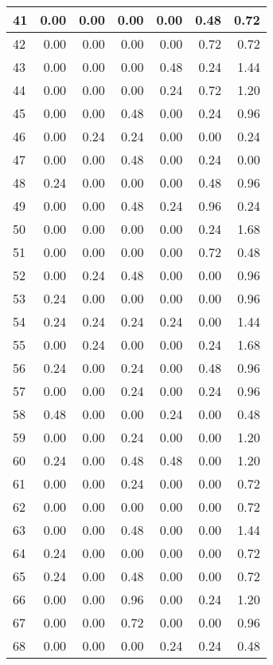 \begin{table}
{\begin{tabular}[t]{l|r|r|r|r|r|r}
\hline
41 & 0.00 & 0.00 & 0.00 & 0.00 & 0.48 & 0.72\\
\hline
42 & 0.00 & 0.00 & 0.00 & 0.00 & 0.72 & 0.72\\
\hline
43 & 0.00 & 0.00 & 0.00 & 0.48 & 0.24 & 1.44\\
\hline
44 & 0.00 & 0.00 & 0.00 & 0.24 & 0.72 & 1.20\\
\hline
45 & 0.00 & 0.00 & 0.48 & 0.00 & 0.24 & 0.96\\
\hline
46 & 0.00 & 0.24 & 0.24 & 0.00 & 0.00 & 0.24\\
\hline
47 & 0.00 & 0.00 & 0.48 & 0.00 & 0.24 & 0.00\\
\hline
48 & 0.24 & 0.00 & 0.00 & 0.00 & 0.48 & 0.96\\
\hline
49 & 0.00 & 0.00 & 0.48 & 0.24 & 0.96 & 0.24\\
\hline
50 & 0.00 & 0.00 & 0.00 & 0.00 & 0.24 & 1.68\\
\hline
51 & 0.00 & 0.00 & 0.00 & 0.00 & 0.72 & 0.48\\
\hline
52 & 0.00 & 0.24 & 0.48 & 0.00 & 0.00 & 0.96\\
\hline
53 & 0.24 & 0.00 & 0.00 & 0.00 & 0.00 & 0.96\\
\hline
54 & 0.24 & 0.24 & 0.24 & 0.24 & 0.00 & 1.44\\
\hline
55 & 0.00 & 0.24 & 0.00 & 0.00 & 0.24 & 1.68\\
\hline
56 & 0.24 & 0.00 & 0.24 & 0.00 & 0.48 & 0.96\\
\hline
57 & 0.00 & 0.00 & 0.24 & 0.00 & 0.24 & 0.96\\
\hline
58 & 0.48 & 0.00 & 0.00 & 0.24 & 0.00 & 0.48\\
\hline
59 & 0.00 & 0.00 & 0.24 & 0.00 & 0.00 & 1.20\\
\hline
60 & 0.24 & 0.00 & 0.48 & 0.48 & 0.00 & 1.20\\
\hline
61 & 0.00 & 0.00 & 0.24 & 0.00 & 0.00 & 0.72\\
\hline
62 & 0.00 & 0.00 & 0.00 & 0.00 & 0.00 & 0.72\\
\hline
63 & 0.00 & 0.00 & 0.48 & 0.00 & 0.00 & 1.44\\
\hline
64 & 0.24 & 0.00 & 0.00 & 0.00 & 0.00 & 0.72\\
\hline
65 & 0.24 & 0.00 & 0.48 & 0.00 & 0.00 & 0.72\\
\hline
66 & 0.00 & 0.00 & 0.96 & 0.00 & 0.24 & 1.20\\
\hline
67 & 0.00 & 0.00 & 0.72 & 0.00 & 0.00 & 0.96\\
\hline
68 & 0.00 & 0.00 & 0.00 & 0.24 & 0.24 & 0.48\\

\end{tabular}}
\end{table}
